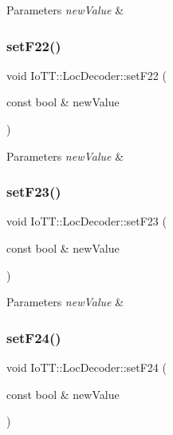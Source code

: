 \begin{DoxyParams}{Parameters}
{\em new\+Value} & \\
\hline
\end{DoxyParams}
\mbox{\label{classIoTT_1_1LocDecoder_a0d378a7a02012c3c3e139ff554b78c6f}} 
\subsubsection{\texorpdfstring{set\+F22()}{setF22()}}
{\footnotesize\ttfamily void Io\+T\+T\+::\+Loc\+Decoder\+::set\+F22 (\begin{DoxyParamCaption}\item[{const bool \&}]{new\+Value }\end{DoxyParamCaption})}


\begin{DoxyParams}{Parameters}
{\em new\+Value} & \\
\hline
\end{DoxyParams}
\mbox{\label{classIoTT_1_1LocDecoder_a49c5c584123beba94068591eb8744d7d}} 
\subsubsection{\texorpdfstring{set\+F23()}{setF23()}}
{\footnotesize\ttfamily void Io\+T\+T\+::\+Loc\+Decoder\+::set\+F23 (\begin{DoxyParamCaption}\item[{const bool \&}]{new\+Value }\end{DoxyParamCaption})}


\begin{DoxyParams}{Parameters}
{\em new\+Value} & \\
\hline
\end{DoxyParams}
\mbox{\label{classIoTT_1_1LocDecoder_a89b14ddd70af0d3c72a3a077cd32df4c}} 
\subsubsection{\texorpdfstring{set\+F24()}{setF24()}}
{\footnotesize\ttfamily void Io\+T\+T\+::\+Loc\+Decoder\+::set\+F24 (\begin{DoxyParamCaption}\item[{const bool \&}]{new\+Value }\end{DoxyParamCaption})}



